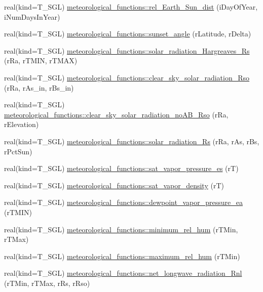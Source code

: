 \begin{DoxyCompactItemize}
\item 
real(kind=T\_\-SGL) \hyperlink{namespacemeteorological__functions_ade7f60bc93f4411aa8c4a157341f8b4b}{meteorological\_\-functions::rel\_\-Earth\_\-Sun\_\-dist} (iDayOfYear, iNumDaysInYear)
\item 
real(kind=T\_\-SGL) \hyperlink{namespacemeteorological__functions_abdb8538c50386c8a369970151f80f73d}{meteorological\_\-functions::sunset\_\-angle} (rLatitude, rDelta)
\item 
real(kind=T\_\-SGL) \hyperlink{namespacemeteorological__functions_ac17c220d158f0bde31c9f9ef399091a1}{meteorological\_\-functions::solar\_\-radiation\_\-Hargreaves\_\-Rs} (rRa, rTMIN, rTMAX)
\item 
real(kind=T\_\-SGL) \hyperlink{namespacemeteorological__functions_a48647f465f1e4cbd25c66406f4b22c56}{meteorological\_\-functions::clear\_\-sky\_\-solar\_\-radiation\_\-Rso} (rRa, rAs\_\-in, rBs\_\-in)
\item 
real(kind=T\_\-SGL) \hyperlink{namespacemeteorological__functions_a333c8237b31d94b94b0e85b8bd434db6}{meteorological\_\-functions::clear\_\-sky\_\-solar\_\-radiation\_\-noAB\_\-Rso} (rRa, rElevation)
\item 
real(kind=T\_\-SGL) \hyperlink{namespacemeteorological__functions_a3f4af0d18369a72079c3cfc0af56eb74}{meteorological\_\-functions::solar\_\-radiation\_\-Rs} (rRa, rAs, rBs, rPctSun)
\item 
real(kind=T\_\-SGL) \hyperlink{namespacemeteorological__functions_a661699aa6c8c654d6aa0ddd8175be9ef}{meteorological\_\-functions::sat\_\-vapor\_\-pressure\_\-es} (rT)
\item 
real(kind=T\_\-SGL) \hyperlink{namespacemeteorological__functions_a67a6a39a9e60d4711972647406a1e6fa}{meteorological\_\-functions::sat\_\-vapor\_\-density} (rT)
\item 
real(kind=T\_\-SGL) \hyperlink{namespacemeteorological__functions_abdb2c6342c1ec952d3697d89a79376b1}{meteorological\_\-functions::dewpoint\_\-vapor\_\-pressure\_\-ea} (rTMIN)
\item 
real(kind=T\_\-SGL) \hyperlink{namespacemeteorological__functions_a573561cffc2aaee2f4570c4d6db0e93b}{meteorological\_\-functions::minimum\_\-rel\_\-hum} (rTMin, rTMax)
\item 
real(kind=T\_\-SGL) \hyperlink{namespacemeteorological__functions_adfe00f4b647649a9b3134e54311d6835}{meteorological\_\-functions::maximum\_\-rel\_\-hum} (rTMin)
\item 
real(kind=T\_\-SGL) \hyperlink{namespacemeteorological__functions_a7144b3142f66dfaf06985f0f908400b4}{meteorological\_\-functions::net\_\-longwave\_\-radiation\_\-Rnl} (rTMin, rTMax, rRs, rRso)

\end{DoxyCompactItemize}
